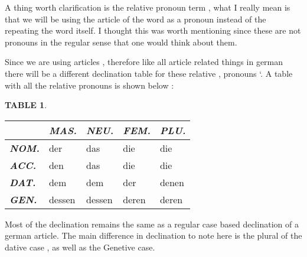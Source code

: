 \documentclass[a4paper,twocolumn,10pt]{article}
\newtheorem{mytable}{TABLE}[section]
\newcommand{\newpar}
{\par \vspace{0.3cm}}
\newcommand{\tcolorboxstart}
{
	\nolinenumbers
	\vspace{0.2cm}
	\centering
}
\newcommand{\tcolorboxend}
{
	\justifying
	\vspace{0.2cm}
	\linenumbers
}
\newcommand{\tcolorboxtable}[5]
{
\tcolorboxstart
\begin{table-bg}#3{}

	\begin{table-title}[width=6.5cm]{}
		\captionsetup{labelformat=empty}
		\captionof{table}{#1}
	\end{table-title}

	\begin{table-theword}
		\footnotesize
		\begin{mytable}
		#2
		\end{mytable}
	\end{table-theword}

	\begin{table-content}
	\begin{tabularx}{\textwidth}{#4}

		#5
		
	\end{tabularx}
	\end{table-content}

\end{table-bg}
\tcolorboxend
}
\begin{document}
A thing worth clarification is the relative pronoun term , what I really mean is
that we will be using the article of the word as a pronoun instead of the
repeating the word itself. I thought this was worth mentioning since these are
not pronouns in the regular sense that one would think about them.\newpar

Since we are using articles , therefore like all article related things in
german there will be a different declination table for these relative , pronouns
`. A table with all the relative pronouns is shown below :\newpar



\tcolorboxtable
{ Relative Pronouns }
{ \label{table:relative_pronouns} }
{ [width=\linewidth] }
{ l|XXXX }
{

		&
		\cellcolor{table-subtopic} \textbf{\textit{MAS.}}  &
		\cellcolor{table-subtopic} \textbf{\textit{NEU.}}  &
		\cellcolor{table-subtopic} \textbf{\textit{FEM.}}  &
		\cellcolor{table-subtopic} \textbf{\textit{PLU.}} \\

		\midrule

		\cellcolor{table-subtopic} \textbf{\textit{NOM.}} &
		\cellcolor{cell-lightpurple}  der            &
		\cellcolor{cell-lightorange}  das            &
		\cellcolor{cell-lightblue}    die            &
		\cellcolor{cell-lightblue}    die \\

		\cellcolor{table-subtopic} \textbf{\textit{ACC.}} &
		\cellcolor{cell-lightgreen}   den            &
		\cellcolor{cell-lightorange}  das            &
		\cellcolor{cell-lightblue}    die            &
		\cellcolor{cell-lightblue}    die \\

		\cellcolor{table-subtopic} \textbf{\textit{DAT.}} &
		\cellcolor{cell-lightred}    dem             &
		\cellcolor{cell-lightred}    dem             &
		\cellcolor{cell-lightpurple} der             &
		\cellcolor{cell-lightgreen}  denen \\

		\cellcolor{table-subtopic} \textbf{\textit{GEN.}} &
		\cellcolor{cell-lightyellow} dessen               &
		\cellcolor{cell-lightyellow} dessen               &
		\cellcolor{cell-lightpurple} deren               &
		\cellcolor{cell-lightpurple} deren \\

}

Most of the declination remains the same as a regular case based declination of
a german article.  The main difference in declination to note here is the plural of the dative case
, as well as the Genetive case.\newpar
\end{document}
